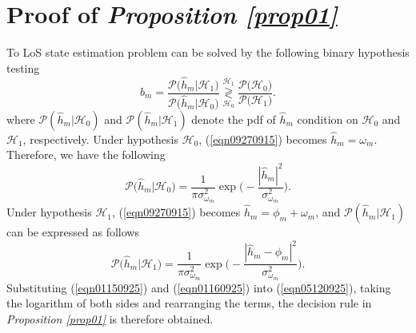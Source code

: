 \documentclass[conference, a4paper]{IEEEtran}
\renewcommand{\eqref}[1]{(\ref{#1})}
\newcommand{\propref}[1]{{\it Proposition \ref{#1}}}
\begin{document}
\section{Proof of \propref{prop01}} \label{appA}
To LoS state estimation problem can be solved by the following binary hypothesis testing \cite{Cook2012}
\begin{equation} \label{eqn05120925}
	\hat{b}_{m} = \frac{\mathcal{P}\big(\hat{h}_{m}|\mathcal{H}_{1}\big)}{\mathcal{P}\big(\hat{h}_{m}|\mathcal{H}_{0}\big)} \underset{\mathcal{H}_{0}}{\overset{\mathcal{H}_{1}}{\gtrless}} \frac{\mathcal{P}\big(\mathcal{H}_{0}\big)}{\mathcal{P}\big(\mathcal{H}_{1}\big)}.
\end{equation}
where $\mathcal{P}(\hat{h}_{m}|\mathcal{H}_{0})$ and $\mathcal{P}(\hat{h}_{m}|\mathcal{H}_{1})$ denote the \gls{pdf} of $\hat{h}_{m}$ condition on $\mathcal{H}_{0}$ and $\mathcal{H}_{1}$, respectively.
Under hypothesis $\mathcal{H}_{0}$, \eqref{eqn09270915} becomes $\hat{h}_{m} = \omega_{m}$.
Therefore, we have the following
\begin{equation}\label{eqn01150925}
	\mathcal{P}\big(\hat{h}_{m}|\mathcal{H}_{0}\big) = \frac{1}{\pi\sigma_{\omega_{m}}^{2}}
	\exp\bigg(-\dfrac{|\hat{h}_{m}|^{2}}{\sigma_{\omega_{m}}^{2}}\bigg).
\end{equation}
Under hypothesis $\mathcal{H}_{1}$, \eqref{eqn09270915} becomes $\hat{h}_m = \phi_m + \omega_m$, and $\mathcal{P}(\hat{h}_{m}|\mathcal{H}_{1})$ can be expressed as follows
\begin{equation}\label{eqn01160925}
	\mathcal{P}\big(\hat{h}_{m}|\mathcal{H}_{1}\big) = \frac{1}{\pi\sigma_{\omega_{m}}^{2}}
	\exp\bigg(-\dfrac{|\hat{h}_{m} - \phi_{m}|^{2}}{\sigma_{\omega_{m}}^{2}}\bigg).
\end{equation}
Substituting \eqref{eqn01150925} and \eqref{eqn01160925} into \eqref{eqn05120925},  taking the logarithm of both sides and rearranging the terms, the decision rule in \propref{prop01} is therefore obtained.
\end{document}
